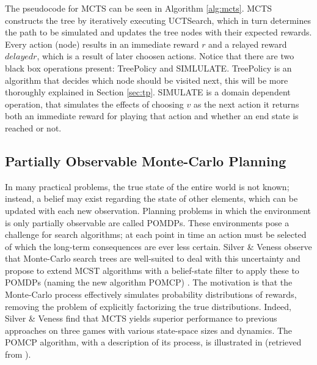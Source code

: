 

The pseudocode for MCTS can be seen in Algorithm \ref{alg:mcts}. MCTS constructs the tree by iteratively executing UCTSearch, which in turn determines the path to be simulated and updates the tree nodes with their expected rewards. Every action (node) results in an immediate reward $r$ and a relayed reward $delayedr$, which is a result of later choosen actions. Notice that there are two black box operations present: TreePolicy and SIMLULATE. TreePolicy is an algorithm that decides which node should be visited next, this will be more thoroughly explained in Section \ref{sec:tp}. SIMULATE is a domain dependent operation, that simulates the effects of choosing $v$ as the next action it returns both an immediate reward for playing that action and whether an end state is reached or not.

\subsection{Partially Observable Monte-Carlo Planning}
In many practical problems, the true state of the entire world is not known; instead, a belief may exist regarding the state of other elements, which can be updated with each new observation. Planning problems in which the environment is only partially observable are called POMDPs. These environments pose a challenge for search algorithms; at each point in time an action must be selected of which the long-term consequences are ever less certain. Silver \& Veness observe that Monte-Carlo search trees are well-suited to deal with this uncertainty and propose to extend MCST algorithms with a belief-state filter to apply these to POMDPs (naming the new algorithm POMCP) \cite{silver2010monte}. The motivation is that the Monte-Carlo process effectively simulates probability distributions of rewards, removing the problem of explicitly factorizing the true distributions. Indeed, Silver \& Veness find that MCTS yields superior performance to previous approaches on three games with various state-space sizes and dynamics. The POMCP algorithm, with a description of its process, is illustrated in  (retrieved from \cite{silver2010monte}). 


